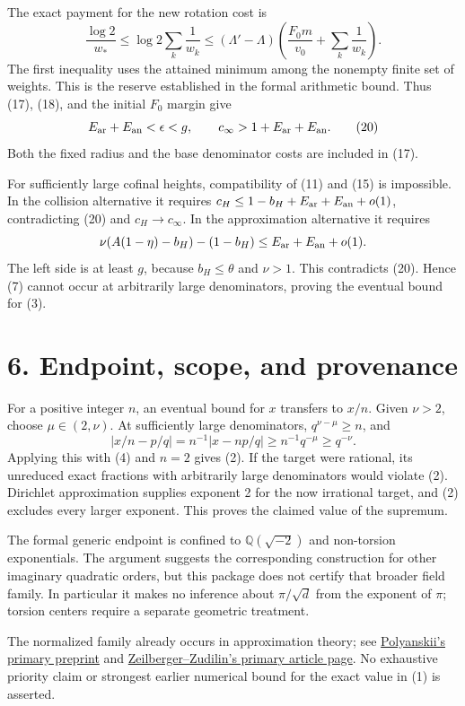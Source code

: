 \documentclass[11pt]{article}
\begin{document}
The exact payment for the new rotation cost is \[
\frac{\log2}{w_*}\le\log2\sum_k\frac1{w_k}
\le(\Lambda'-\Lambda)
\left(\frac{F_0m}{v_0}+\sum_k\frac1{w_k}\right).
\tag{19}
\] The first inequality uses the attained minimum among the nonempty
finite set of weights. This is the reserve established in the formal
arithmetic bound. Thus (17), (18), and the initial \(F_0\) margin give
\[
E_{\rm ar}+E_{\rm an}<\epsilon<g,
\qquad c_\infty>1+E_{\rm ar}+E_{\rm an}.
\tag{20}
\] Both the fixed radius and the base denominator costs are included in
(17).

For sufficiently large cofinal heights, compatibility of (11) and (15)
is impossible. In the collision alternative it requires
\(c_H\le1-b_H+E_{\rm ar}+E_{\rm an}+o(1)\), contradicting (20) and
\(c_H\to c_\infty\). In the approximation alternative it requires \[
\nu(A(1-\eta)-b_H)-(1-b_H)
\le E_{\rm ar}+E_{\rm an}+o(1).
\] The left side is at least \(g\), because \(b_H\le\theta\) and
\(\nu>1\). This contradicts (20). Hence (7) cannot occur at arbitrarily
large denominators, proving the eventual bound for (3).

\section{6. Endpoint, scope, and
provenance}\label{endpoint-scope-and-provenance}

For a positive integer \(n\), an eventual bound for \(x\) transfers to
\(x/n\). Given \(\nu>2\), choose \(\mu\in(2,\nu)\). At sufficiently
large denominators, \(q^{\nu-\mu}\ge n\), and \[
|x/n-p/q|=n^{-1}|x-np/q|\ge n^{-1}q^{-\mu}\ge q^{-\nu}.
\] Applying this with (4) and \(n=2\) gives (2). If the target were
rational, its unreduced exact fractions with arbitrarily large
denominators would violate (2). Dirichlet approximation supplies
exponent 2 for the now irrational target, and (2) excludes every larger
exponent. This proves the claimed value of the supremum.

The formal generic endpoint is confined to \(\mathbb Q(\sqrt{-2})\) and
non-torsion exponentials. The argument suggests the corresponding
construction for other imaginary quadratic orders, but this package does
not certify that broader field family. In particular it makes no
inference about \(\pi/\sqrt d\) from the exponent of \(\pi\); torsion
centers require a separate geometric treatment.

The normalized family already occurs in approximation theory; see
\href{https://arxiv.org/pdf/1501.06752}{Polyanskii's primary preprint}
and
\href{https://sites.math.rutgers.edu/~zeilberg/mamarim/mamarimhtml/gat.html}{Zeilberger--Zudilin's
primary article page}. No exhaustive priority claim or strongest earlier
numerical bound for the exact value in (1) is asserted.
\end{document}
